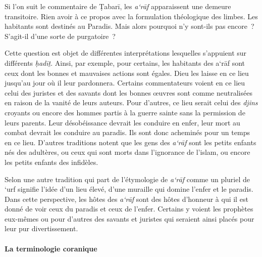 Si l'on suit le commentaire de Ṭabarī, les \emph{a`rāf} apparaissent une
demeure transitoire. Rien avoir à ce propos avec la formulation
théologique des limbes. Les habitants sont destinés au Paradis. Mais
alors pourquoi n'y sont-ils pas encore~? S'agit-il d'une sorte de
purgatoire~?

Cette question est objet de différentes interprétations lesquelles
s'appuient sur différents \emph{ḥadīṯ}. Ainsi, par exemple, pour
certains, les habitants des a`rāf sont ceux dont les bonnes et mauvaises
actions sont égales. Dieu les laisse en ce lieu jusqu'au jour où il leur
pardonnera. Certains commentateurs voient en ce lieu celui des juristes
et des savants dont les bonnes œuvres sont comme neutralisées en raison
de la vanité de leurs auteurs. Pour d'autres, ce lieu serait celui des
\emph{djins} croyants ou encore des hommes partis à la guerre sainte
sans la permission de leurs parents. Leur désobéissance devrait les
conduire en enfer, leur mort au combat devrait les conduire au paradis.
Ils sont donc acheminés pour un temps en ce lieu. D'autres traditions
notent que les gens des \emph{a`rāf} sont les petits enfants nés des
adultères, ou ceux qui sont morts dans l'ignorance de l'islam, ou encore
les petits enfants des infidèles.

Selon une autre tradition qui part de l'étymologie de \emph{a`rāf} comme
un pluriel de `urf signifie l'idée d'un lieu élevé, d'une muraille qui
domine l'enfer et le paradis. Dans cette perspective, les hôtes des
\emph{a`rāf} sont des hôtes d'honneur à qui il est donné de voir ceux du
paradis et ceux de l'enfer. Certains y voient les prophètes eux-mêmes ou
pour d'autres des savants et juristes qui seraient ainsi placés pour
leur pur divertissement.



\paragraph{La terminologie
coranique} 

